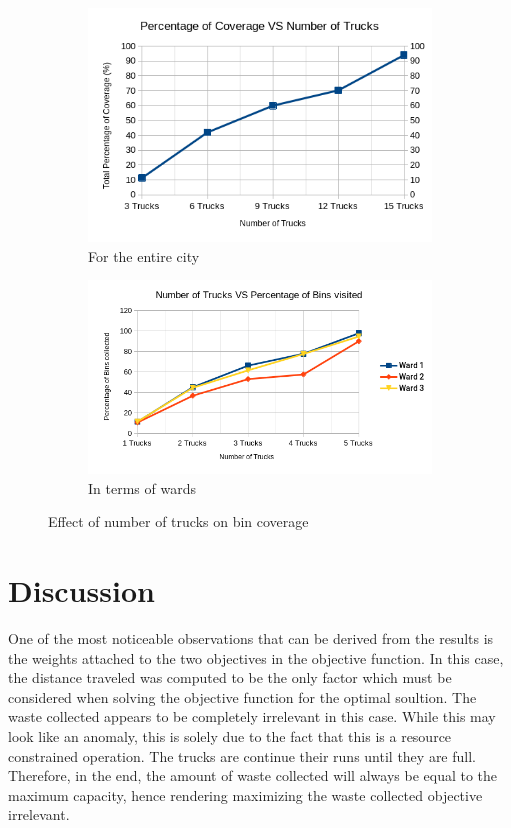 \documentclass[12pt]{article}
\begin{document}
\begin{figure}[H]
    \centering
    \begin{subfigure}{0.5\textwidth}
        \centering
        \includegraphics[width=\linewidth]{coverage_VS_number_of_trucks.png}
        \caption{For the entire city}\label{figc1}
    \end{subfigure}%
    \begin{subfigure}{0.5\textwidth}
        \centering
        \includegraphics[width=\linewidth]{number_of_trucks_VS_bins_visited.png}
        \caption{In terms of wards}\label{figc2}
    \end{subfigure}
    \caption{Effect of number of trucks on bin coverage}
    \label{fig3}
\end{figure}

\section{Discussion}
One of the most noticeable observations that can be derived from the results is the weights attached to the two objectives in the objective function. In this case, the distance traveled was computed to be the only factor which must be considered when solving the objective function for the optimal soultion. The waste collected appears to be completely irrelevant in this case. While this may look like an anomaly, this is solely due to the fact that this is a resource constrained operation. The trucks are continue their runs until they are full. Therefore, in the end, the amount of waste collected will always be equal to the maximum capacity, hence rendering maximizing the waste collected objective irrelevant.
\end{document}
